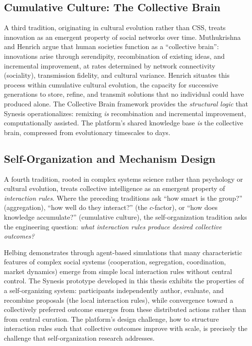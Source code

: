 \documentclass[a4paper, 12pt, twoside]{iviathesis}
\begin{document}
\subsection{Cumulative Culture: The Collective Brain}

A third tradition, originating in cultural evolution rather than CSS, treats innovation as an emergent property of social networks over time. Muthukrishna and Henrich \cite{muthukrishna2016innovation} argue that human societies function as a ``collective brain'': innovations arise through serendipity, recombination of existing ideas, and incremental improvement, at rates determined by network connectivity (sociality), transmission fidelity, and cultural variance. Henrich \cite{henrich2016secret} situates this process within cumulative cultural evolution, the capacity for successive generations to store, refine, and transmit solutions that no individual could have produced alone. The Collective Brain framework provides the \textit{structural logic} that Synesis operationalizes: remixing \textit{is} recombination and incremental improvement, computationally assisted. The platform's shared knowledge base \textit{is} the collective brain, compressed from evolutionary timescales to days.

\subsection{Self-Organization and Mechanism Design}

A fourth tradition, rooted in complex systems science rather than psychology or cultural evolution, treats collective intelligence as an emergent property of \textit{interaction rules}. Where the preceding traditions ask ``how smart is the group?'' (aggregation), ``how well do they interact?'' (the $c$-factor), or ``how does knowledge accumulate?'' (cumulative culture), the self-organization tradition asks the engineering question: \textit{what interaction rules produce desired collective outcomes?}

Helbing \cite{helbing2012social} demonstrates through agent-based simulations that many characteristic features of complex social systems (cooperation, segregation, coordination, market dynamics) emerge from simple local interaction rules without central control. 
The Synesis prototype developed in this thesis exhibits the properties of a self-organizing system: participants independently author, evaluate, and recombine proposals (the local interaction rules), while convergence toward a collectively preferred outcome emerges from these distributed actions rather than from central curation. The platform's design challenge, how to structure interaction rules such that collective outcomes improve with scale, is precisely the challenge that self-organization research addresses.
\end{document}
